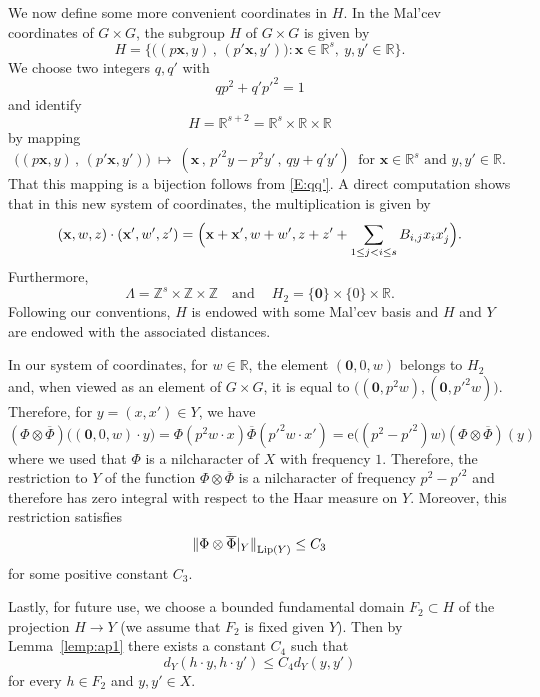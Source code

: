 \documentclass[11pt]{amsart}
\theoremstyle{definition}
\begin{document}
We  now define some more convenient coordinates in $H$.
In the Mal'cev coordinates of $G\times G$, the subgroup $H$ of $G\times G$ is given by
$$
H= \bigl\{\bigl( (p{{\mathbf{x}}},y)\,,\,(p'{{\mathbf{x}}},y')\bigr)\colon {{\mathbf{x}}}\in{{\mathbb R}}^s,\ y,y'\in{{\mathbb R}}\bigr\}.
$$
We choose two integers $q,q'$ with
\begin{equation}\label{E:qq'}
qp^2+q'p'^2=1
\end{equation}
 and identify
$$
H={{\mathbb R}}^{s+2}={{\mathbb R}}^s\times{{\mathbb R}}\times{{\mathbb R}}
$$
by mapping
$$
\bigl((p{{\mathbf{x}}},y)\,,\,(p'{{\mathbf{x}}},y')\bigr)\  \longmapsto\ ({{\mathbf{x}}}\,,\, p'^2y-p^2y'\,,\,qy+q'y')
\ \text{ for }{{\mathbf{x}}}\in{{\mathbb R}}^s\text{ and }y,y'\in{{\mathbb R}}.
$$
That this mapping is a bijection follows from \eqref{E:qq'}. A direct computation shows that in this new system of coordinates, the multiplication is given by
\begin{equation}
\label{eq:multH}
({{\mathbf{x}}},w,z)\cdot({{\mathbf{x}}}',w',z')=\Bigl({{\mathbf{x}}}+{{\mathbf{x}}}',w+w',z+z'+\sum_{1\leq j<i\leq s}B_{i,j}x_ix'_j \Bigr).
\end{equation}
Furthermore,
\begin{equation}
\label{eq:Lambda-H2}
\Lambda={{\mathbb Z}}^s\times{{\mathbb Z}}\times{{\mathbb Z}} \quad  \text{and} \quad  \ H_2=\{{{\boldsymbol{0}}}\}\times\{0\}\times{{\mathbb R}}.
\end{equation}
Following our conventions, $H$ is endowed with some Mal'cev basis and $H$ and $Y$ are endowed with the associated  distances.

In our system of coordinates, for $w\in {{\mathbb R}}$,  the element $({{\boldsymbol{0}}},0,w)$ belongs to $H_2$ and, when viewed as an element of $G\times G$, it is equal to $\bigl(({{\boldsymbol{0}}}, p^2w),({{\boldsymbol{0}}},p'^2w)\bigr)$. Therefore, for $y=(x,x')\in Y$, we have
$$
(\Phi\otimes\overline\Phi)\bigl(({{\boldsymbol{0}}},0,w)\cdot y\bigr)=\Phi(p^2w\cdot x)\overline\Phi(p'^2w\cdot x')={\mathrm{e}}\bigl((p^2-p'^2)w) (\Phi\otimes\overline\Phi)(y)
$$
where we used that $\Phi$ is a nilcharacter of $X$ with frequency $1$.
Therefore,  the restriction to $Y$ of the function $\Phi\otimes\overline\Phi$ is a nilcharacter of frequency $p^2-p'^2$ and therefore has  zero integral with respect to the Haar measure on $Y$. Moreover, this restriction satisfies
$$
{\lVert {\Phi\otimes\overline\Phi\vert_Y} \rVert}_{{{\text{\rm Lip}}}(Y)}\leq C_3
$$
for some positive constant $C_3$.

Lastly, for future use, we choose a bounded fundamental domain  $F_2\subset H$  of the projection $H\to Y$ (we assume that $F_2$ is fixed given $Y$).
Then by Lemma~\ref{lemp:ap1}  there exists a constant $C_4$ such that
\begin{equation}
\label{eq:C6}
d_Y(h\cdot y,h\cdot y')\leq C_4d_Y(y,y')
\end{equation}
for every $h\in F_2$ and $y,y'\in X$.
\end{document}
